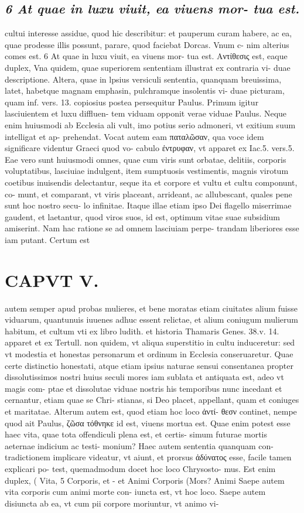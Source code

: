 \documentclass{article}
\begin{document}
\begin{pages}
\subsection*{\textit{6 At quae in luxu viuit, ea viuens mor- tua est.}}cultui interesse assidue, quod hic describitur: et pauperum curam habere, ac ea, quae prodesse illis possunt, parare, quod faciebat Dorcas. Vnum c- nim alterius comes est. 6 At quae in luxu viuit, ea viuens mor- tua est. Αντίθεσις est, eaque duplex, Vna quidem, quae superiorem sententiam illustrat ex contraria vi- duae descriptione. Altera, quae in lpsius versiculi sententia, quanquam breuissima, latet, habetque magnam emphasin, pulchramque insolentis vi- duae picturam, quam inf. vers. 13. copiosius postea persequitur Paulus. Primum igitur lasciuientem et luxu diffluen- tem viduam opponit verae viduae Paulus. Neque enim huiusmodi ab Ecclesia ali vult, imo potius serio admoneri, vt exitium suum intelligat et ap- prehendat. Vocat autem eam παταλῶσαν, qua voce idem significare videntur Graeci quod vo- cabulo ἐντρυφαν, vt apparet ex Iac.5. vers.5. Eae vero sunt huiusmodi omnes, quae cum viris sunt orbatae, delitiis, corporis voluptatibus, lasciuiae indulgent, item sumptuosis vestimentis, magnis virotum coetibus inuisendis delectantur, seque ita et corpore et vultu et cultu componunt, co- munt, et comparant, vt viris placeant, arrideant, ac allubescant, quales pene sunt hoc nostro secu- lo infinitae. Itaque illae etiam ipso Dei flagello miserrimae gaudent, et laetantur, quod viros suos, id est, optimum vitae suae subsidium amiserint. Nam hac ratione se ad omnem lasciuiam perpe- trandam liberiores esse iam putant. Certum est  \pend
\section*{CAPVT V. }
\marginpar{[ p.263 ]}\pstart autem semper apud probas mulieres, et bene moratas etiam ciuitates alium fuisse viduarum, quantunuis iuuenes adhuc essent relictae, et alium coniugum mulierum habitum, et cultum vti ex libro ludith. et historia Thamaris Genes. 38.v. 14. apparet et ex Tertull. non quidem, vt aliqua superstitio in cultu induceretur: sed vt modestia et honestas personarum et ordinum in Ecclesia conseruaretur. Quae certe distinctio honestati, atque etiam ipsius naturae sensui consentanea propter dissolutissimos nostri huius seculi mores iam sublata et antiquata est, adeo vt magis com- ptae et dissolutae viduae nostris his temporibus nunc incedant et cernantur, etiam quae se Chri- stianas, si Deo placet, appellant, quam et coniuges et maritatae. Alterum autem est, quod etiam hoc loco ἀντί- θεσν continet, nempe quod ait Paulus, ζῶσα τόθνηκε id est, viuens mortua est. Quae enim potest esse haec vita, quae tota offendiculi plena est, et certis- simum futurae mortis aeternae indicium ac testi- monium? Haec autem sententia quanquam con- tradictionem implicare videatur, vt aiunt, et prorsus ἀδύνατος esse, facile tamen explicari po- test, quemadmodum docet hoc loco Chrysosto- mus. Est enim duplex, ( Vita, 5 Corporis, et - et Animi  Corporis (Mors? Animi Saepe autem vita corporis cum animi morte con- iuncta est, vt hoc loco. Saepe autem disiuncta ab ea, vt cum pii corpore moriuntur, vt animo vi-  \pend

\end{pages}
\end{document}
